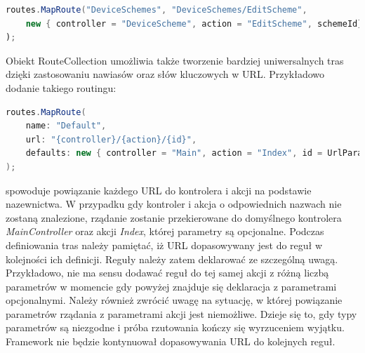 \begin{lstlisting}[language=Java]
routes.MapRoute("DeviceSchemes", "DeviceSchemes/EditScheme", 
	new { controller = "DeviceScheme", action = "EditScheme", schemeId})
);
\end{lstlisting}
Obiekt RouteCollection umożliwia także tworzenie bardziej uniwersalnych tras dzięki zastosowaniu nawiasów oraz słów kluczowych w URL. Przykładowo dodanie takiego routingu:
\begin{lstlisting}[language=Java]
routes.MapRoute(
    name: "Default",
    url: "{controller}/{action}/{id}",
    defaults: new { controller = "Main", action = "Index", id = UrlParameter.Optional }
);
\end{lstlisting}
spowoduje powiązanie każdego URL do kontrolera i akcji na podstawie nazewnictwa. W przypadku gdy kontroler i akcja o odpowiednich nazwach nie zostaną znalezione, rządanie zostanie przekierowane do domyślnego kontrolera \textit{MainController} oraz akcji \textit{Index}, której parametry są opcjonalne.
Podczas definiowania tras należy pamiętać, iż URL dopasowywany jest do reguł w kolejności ich definicji. Reguły należy zatem deklarować ze szczególną uwagą. Przykładowo, nie ma sensu dodawać reguł do tej samej akcji z różną liczbą parametrów w momencie gdy powyżej znajduje się deklaracja z parametrami opcjonalnymi. Należy również zwrócić uwagę na sytuację, w której powiązanie parametrów rządania z parametrami akcji jest niemożliwe. Dzieje się to, gdy typy parametrów są niezgodne i próba rzutowania kończy się wyrzuceniem wyjątku. Framework nie będzie kontynuował dopasowywania URL do kolejnych reguł.



